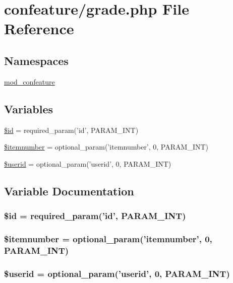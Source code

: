 \hypertarget{grade_8php}{\section{confeature/grade.php File Reference}
\label{grade_8php}
}
\subsection*{Namespaces}
\begin{DoxyCompactItemize}
\item 
\hyperlink{namespacemod__confeature}{mod\-\_\-confeature}
\end{DoxyCompactItemize}
\subsection*{Variables}
\begin{DoxyCompactItemize}
\item 
\hyperlink{grade_8php_ae97941710d863131c700f069b109991e}{\$id} = required\-\_\-param('id', P\-A\-R\-A\-M\-\_\-\-I\-N\-T)
\item 
\hyperlink{grade_8php_a69188eef46ed038c002ce9a5b37ce6dc}{\$itemnumber} = optional\-\_\-param('itemnumber', 0, P\-A\-R\-A\-M\-\_\-\-I\-N\-T)
\item 
\hyperlink{grade_8php_ae3f4f74a2aff9863a4767269a47aea11}{\$userid} = optional\-\_\-param('userid', 0, P\-A\-R\-A\-M\-\_\-\-I\-N\-T)
\end{DoxyCompactItemize}


\subsection{Variable Documentation}
\hypertarget{grade_8php_ae97941710d863131c700f069b109991e}{
\subsubsection[{\$id}]{\setlength{\rightskip}{0pt plus 5cm}\$id = required\-\_\-param('id', P\-A\-R\-A\-M\-\_\-\-I\-N\-T)}}\label{grade_8php_ae97941710d863131c700f069b109991e}
\hypertarget{grade_8php_a69188eef46ed038c002ce9a5b37ce6dc}{
\subsubsection[{\$itemnumber}]{\setlength{\rightskip}{0pt plus 5cm}\$itemnumber = optional\-\_\-param('itemnumber', 0, P\-A\-R\-A\-M\-\_\-\-I\-N\-T)}}\label{grade_8php_a69188eef46ed038c002ce9a5b37ce6dc}
\hypertarget{grade_8php_ae3f4f74a2aff9863a4767269a47aea11}{
\subsubsection[{\$userid}]{\setlength{\rightskip}{0pt plus 5cm}\$userid = optional\-\_\-param('userid', 0, P\-A\-R\-A\-M\-\_\-\-I\-N\-T)}}\label{grade_8php_ae3f4f74a2aff9863a4767269a47aea11}
